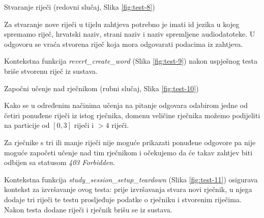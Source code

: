 \begin{packed_item}

    \item Stvaranje riječi (redovni slučaj, Slika \ref{fig:test-8})
    \item[]  \begin{packed_item}

        \item Za stvaranje nove riječi u tijelu zahtjeva potrebno je imati id jezika u kojeg spremamo riječ, hrvatski naziv, strani naziv i naziv spremljene audiodatoteke. U odgovoru se vraća stvorena riječ koja mora odgovarati podacima iz zahtjeva. 
        \item Kontekstna funkcija \emph{revert\_create\_word} (Slika \ref{fig:test-9}) nakon uspješnog testa briše stvorenu riječ iz sustava.
        
    \end{packed_item}

    \item Započni učenje nad rječnikom (rubni slučaj, Slika \ref{fig:test-10})
    \item[]  \begin{packed_item}

        \item  Kako se u određenim načinima učenja na pitanje odgovara odabirom jedne od četiri ponuđene riječi iz istog rječnika, domenu veličine rječnika možemo podijeliti na particije od $\left[0,3 \right]$ riječi i $ > 4$ riječi.
        \item Za rječnike s tri ili manje riječi nije moguće prikazati ponuđene odgovore pa nije moguće započeti učenje nad tim rječnikom i očekujemo da će takav zahtjev biti odbijen sa statusom \emph{403 Forbidden}. 
        \item Kontekstna funkcija \emph{study\_session\_setup\_teardown} (Slika \ref{fig:test-11}) osigurava kontekst za izvršavanje ovog testa: prije izvršavanja stvara novi rječnik, u njega dodaje tri riječi te testu prosljeđuje podatke o rječniku i stvorenim riječima. Nakon testa dodane riječi i rječnik brišu se iz sustava.
        
    \end{packed_item}
    
\end{packed_item}

\clearpage

